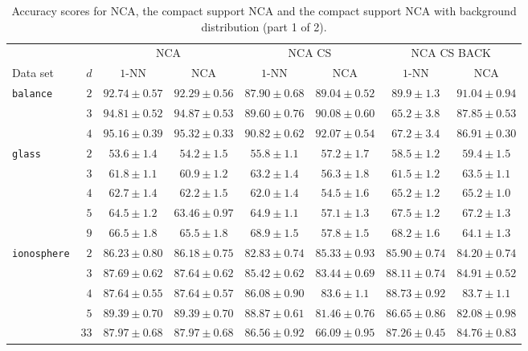 
\begin{landscape}
  \begin{table}
    \centering\begin{tabular}{lrcccccc}
      \toprule
      &     & \multicolumn{2}{c}{NCA}  & \multicolumn{2}{c}{NCA CS} & \multicolumn{2}{c}{NCA CS BACK}\\
      \cmidrule(r){3-4} \cmidrule(r){5-6} \cmidrule(r){7-8}
      Data set & $d$ & $1$-NN & NCA & $1$-NN & NCA & $1$-NN & NCA \\
      \midrule
      \texttt{balance}&$2$&$92.74 \pm 0.57$&$92.29 \pm 0.56$&$87.90 \pm 0.68$&$89.04 \pm 0.52$&$89.9 \pm 1.3$&$91.04 \pm 0.94$\\ 
      &$3$&$94.81 \pm 0.52$&$94.87 \pm 0.53$&$89.60 \pm 0.76$&$90.08 \pm 0.60$&$65.2 \pm 3.8$&$87.85 \pm 0.53$\\ 
      &$4$&$95.16 \pm 0.39$&$95.32 \pm 0.33$&$90.82 \pm 0.62$&$92.07 \pm 0.54$&$67.2 \pm 3.4$&$86.91 \pm 0.30$\\ 
      \midrule
      \texttt{glass}&$2$&$53.6 \pm 1.4$&$54.2 \pm 1.5$&$55.8 \pm 1.1$&$57.2 \pm 1.7$&$58.5 \pm 1.2$&$59.4 \pm 1.5$\\ 
      &$3$&$61.8 \pm 1.1$&$60.9 \pm 1.2$&$63.2 \pm 1.4$&$56.3 \pm 1.8$&$61.5 \pm 1.2$&$63.5 \pm 1.1$\\ 
      &$4$&$62.7 \pm 1.4$&$62.2 \pm 1.5$&$62.0 \pm 1.4$&$54.5 \pm 1.6$&$65.2 \pm 1.2$&$65.2 \pm 1.0$\\ 
      &$5$&$64.5 \pm 1.2$&$63.46 \pm 0.97$&$64.9 \pm 1.1$&$57.1 \pm 1.3$&$67.5 \pm 1.2$&$67.2 \pm 1.3$\\ 
      &$9$&$66.5 \pm 1.8$&$65.5 \pm 1.8$&$68.9 \pm 1.5$&$57.8 \pm 1.5$&$68.2 \pm 1.6$&$64.1 \pm 1.3$\\ 
      \midrule
      \texttt{ionosphere}&$2$&$86.23 \pm 0.80$&$86.18 \pm 0.75$&$82.83 \pm 0.74$&$85.33 \pm 0.93$&$85.90 \pm 0.74$&$84.20 \pm 0.74$\\ 
      &$3$&$87.69 \pm 0.62$&$87.64 \pm 0.62$&$85.42 \pm 0.62$&$83.44 \pm 0.69$&$88.11 \pm 0.74$&$84.91 \pm 0.52$\\ 
      &$4$&$87.64 \pm 0.55$&$87.64 \pm 0.57$&$86.08 \pm 0.90$&$83.6 \pm 1.1$&$88.73 \pm 0.92$&$83.7 \pm 1.1$\\ 
      &$5$&$89.39 \pm 0.70$&$89.39 \pm 0.70$&$88.87 \pm 0.61$&$81.46 \pm 0.76$&$86.65 \pm 0.86$&$82.08 \pm 0.98$\\ 
      &$33$&$87.97 \pm 0.68$&$87.97 \pm 0.68$&$86.56 \pm 0.92$&$66.09 \pm 0.95$&$87.26 \pm 0.45$&$84.76 \pm 0.83$\\ 
      \bottomrule
    \end{tabular}
  \caption[Accuracy for NCA, the compact support NCA and the compact support NCA with background distribution (part 1 of 2)]{Accuracy scores for NCA, the compact support NCA and the compact support NCA with background distribution (part 1 of 2).}
  \label{app:tab:nca-cs-scores-1}
  \end{table}


\end{landscape}
